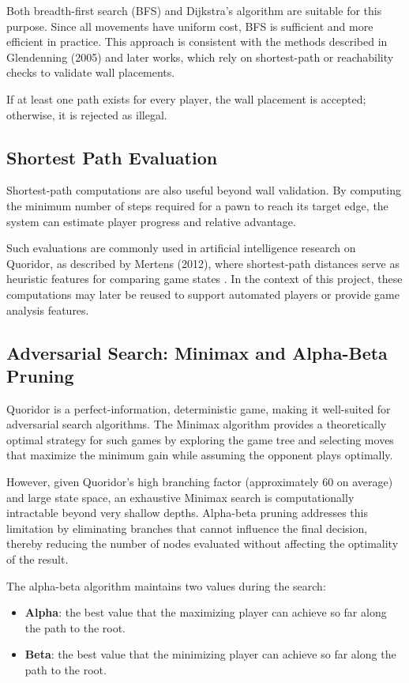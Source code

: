 \documentclass[a4paper]{article}
\begin{document}
Both breadth-first search (BFS) and Dijkstra's algorithm are suitable for this
purpose. Since all movements have uniform cost, BFS is sufficient and more
efficient in practice. This approach is consistent with the methods described
in Glendenning (2005) and later works, which rely on shortest-path or
reachability checks to validate wall placements.

If at least one path exists for every player, the wall placement is accepted;
otherwise, it is rejected as illegal.

\subsection{Shortest Path Evaluation}

Shortest-path computations are also useful beyond wall validation. By
computing the minimum number of steps required for a pawn to reach its target
edge, the system can estimate player progress and relative advantage.

Such evaluations are commonly used in artificial intelligence research on
Quoridor, as described by Mertens (2012), where shortest-path distances serve
as heuristic features for comparing game states \cite{mertens2012quoridor}. In
the context of this project, these computations may later be reused to support
automated players or provide game analysis features.

\subsection{Adversarial Search: Minimax and Alpha-Beta Pruning}

Quoridor is a perfect-information, deterministic game, making it well-suited
for adversarial search algorithms. The Minimax algorithm provides a
theoretically optimal strategy for such games by exploring the game tree and
selecting moves that maximize the minimum gain while assuming the opponent
plays optimally.

However, given Quoridor's high branching factor (approximately 60 on average)
and large state space, an exhaustive Minimax search is computationally
intractable beyond very shallow depths. Alpha-beta pruning addresses this
limitation by eliminating branches that cannot influence the final decision,
thereby reducing the number of nodes evaluated without affecting the optimality
of the result.

The alpha-beta algorithm maintains two values during the search:
\begin{itemize}
  \item \textbf{Alpha}: the best value that the maximizing player can achieve
    so far along the path to the root.
  \item \textbf{Beta}: the best value that the minimizing player can achieve
    so far along the path to the root.
\end{itemize}
\end{document}
